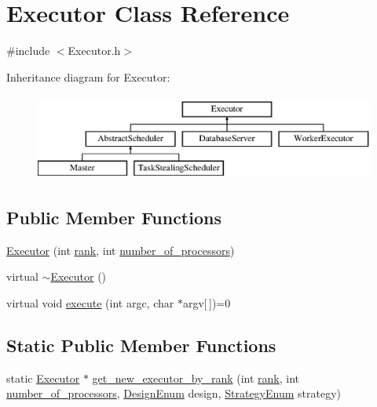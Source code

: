 \hypertarget{class_executor}{}\section{Executor Class Reference}
\label{class_executor}


{\ttfamily \#include $<$Executor.\+h$>$}

Inheritance diagram for Executor\+:\begin{figure}[H]
\begin{center}
\leavevmode
\includegraphics[height=2.818792cm]{class_executor}
\end{center}
\end{figure}
\subsection*{Public Member Functions}
\begin{DoxyCompactItemize}
\item 
\hyperlink{class_executor_ad0a052ec3c021786fed3c8d336ab0659}{Executor} (int \hyperlink{class_executor_a33c24e2887b4d9c4ef7f3566d3bc803e}{rank}, int \hyperlink{class_executor_a4e798bde66d26fe200de7e8d2b54e915}{number\+\_\+of\+\_\+processors})
\item 
virtual \hyperlink{class_executor_a23108c89c4a25e22c927115191c04b26}{$\sim$\+Executor} ()
\item 
virtual void \hyperlink{class_executor_aabad4923751a6ea70ca536d4d1f2f32a}{execute} (int argc, char $\ast$argv\mbox{[}$\,$\mbox{]})=0
\end{DoxyCompactItemize}
\subsection*{Static Public Member Functions}
\begin{DoxyCompactItemize}
\item 
static \hyperlink{class_executor}{Executor} $\ast$ \hyperlink{class_executor_ab193432d6f64407c45780629e3341a87}{get\+\_\+new\+\_\+executor\+\_\+by\+\_\+rank} (int \hyperlink{class_executor_a33c24e2887b4d9c4ef7f3566d3bc803e}{rank}, int \hyperlink{class_executor_a4e798bde66d26fe200de7e8d2b54e915}{number\+\_\+of\+\_\+processors}, \hyperlink{_design_enum_8h_aefcba5d81ba393e442410d16ebe78ac7}{Design\+Enum} design, \hyperlink{_strategy_enum_8h_aa770fe6711c27326278b9e4ab326cd10}{Strategy\+Enum} strategy)
\end{DoxyCompactItemize}
